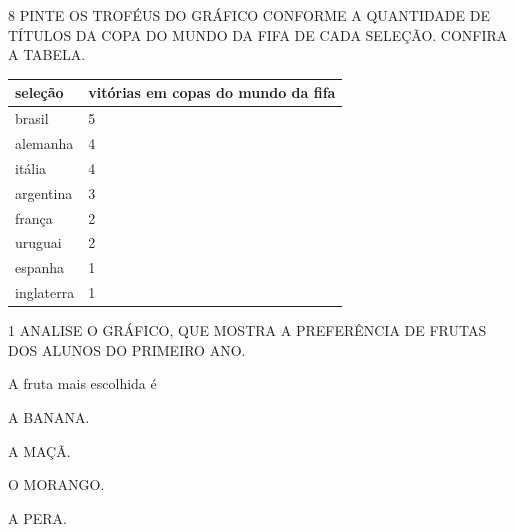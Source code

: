 
\num{8} PINTE OS TROFÉUS DO GRÁFICO CONFORME A QUANTIDADE DE TÍTULOS DA COPA DO
MUNDO DA FIFA DE CADA SELEÇÃO. CONFIRA A TABELA.

\begin{longtable}[]{@{}ll@{}}
\toprule
seleção & vitórias em copas do mundo da fifa\tabularnewline
\midrule
\endhead
brasil & 5\tabularnewline
alemanha & 4\tabularnewline
itália & 4\tabularnewline
argentina & 3\tabularnewline
frança & 2\tabularnewline
uruguai & 2\tabularnewline
espanha & 1\tabularnewline
inglaterra & 1\tabularnewline
\bottomrule
\end{longtable}




\num{1} ANALISE O GRÁFICO, QUE MOSTRA A PREFERÊNCIA DE FRUTAS DOS ALUNOS DO PRIMEIRO ANO.


A fruta mais escolhida é

\begin{escolha}
\item A BANANA.

\item A MAÇÃ.

\item O MORANGO.

\item A PERA.
\end{escolha}


